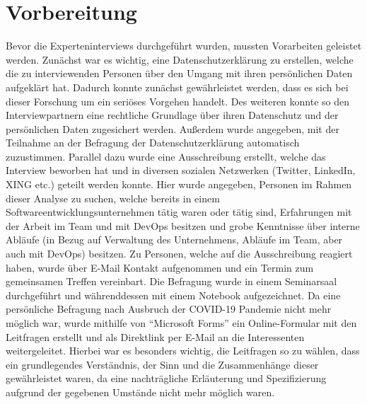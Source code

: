\section{Vorbereitung}
Bevor die Experteninterviews durchgeführt wurden, mussten Vorarbeiten geleistet werden. Zunächst war es wichtig, eine Datenschutzerklärung zu erstellen, welche die zu interviewenden Personen über den Umgang mit
ihren persönlichen Daten aufgeklärt hat. Dadurch konnte zunächst gewährleistet werden, dass es sich bei dieser Forschung um ein seriöses Vorgehen handelt. Des weiteren konnte so den Interviewpartnern eine rechtliche
Grundlage über ihren Datenschutz und der persönlichen Daten zugesichert werden. Außerdem wurde angegeben, mit der Teilnahme an der Befragung der Datenschutzerklärung automatisch zuzustimmen. \newline 
Parallel dazu wurde eine Ausschreibung erstellt, welche das Interview beworben hat und in diversen sozialen Netzwerken (Twitter, LinkedIn, XING etc.) geteilt werden konnte. Hier wurde angegeben, Personen im Rahmen dieser 
Analyse zu suchen, welche bereits in einem Softwareentwicklungsunternehmen tätig waren oder tätig sind, Erfahrungen mit der Arbeit im Team und mit DevOps besitzen und grobe Kenntnisse über interne Abläufe (in Bezug auf 
Verwaltung des Unternehmens, Abläufe im Team, aber auch mit DevOps) besitzen. \newline \newline
Zu Personen, welche auf die Ausschreibung reagiert haben, wurde über E-Mail Kontakt aufgenommen und ein Termin zum gemeinsamen Treffen vereinbart. Die Befragung wurde in einem Seminarsaal durchgeführt und währenddessen mit
einem Notebook aufgezeichnet. Da eine persönliche Befragung nach Ausbruch der COVID-19 Pandemie nicht mehr möglich war, wurde mithilfe von \enquote{Microsoft Forms} ein Online-Formular mit den Leitfragen erstellt und 
als Direktlink per E-Mail an die Interessenten weitergeleitet. Hierbei war es besonders wichtig, die Leitfragen so zu wählen, dass ein grundlegendes Verständnis, der Sinn und die Zusammenhänge dieser gewährleistet waren, 
da eine nachträgliche Erläuterung und Spezifizierung aufgrund der gegebenen Umstände nicht mehr möglich waren.

